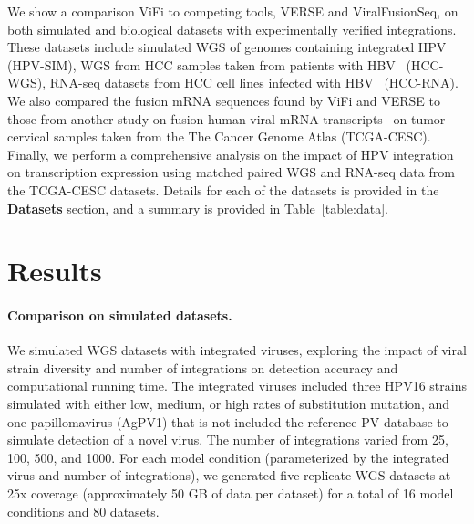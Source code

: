 \documentclass[10pt]{article}
\begin{document}
We show a comparison ViFi to competing tools, VERSE and ViralFusionSeq, on both simulated and biological datasets with experimentally verified integrations.  These datasets include simulated WGS of genomes containing integrated HPV (HPV-SIM), WGS from HCC samples taken from patients with HBV~\cite{Sung2012} (HCC-WGS), RNA-seq datasets from HCC cell lines infected with HBV~\cite{Lau2014} (HCC-RNA).  We also compared the fusion mRNA sequences found by ViFi and VERSE to those from another study on fusion human-viral mRNA transcripts~\cite{Tang2013} on tumor cervical samples taken from the The Cancer Genome Atlas (TCGA-CESC).  Finally, we perform a comprehensive analysis on the impact of HPV integration on transcription expression using matched paired WGS and RNA-seq data from the TCGA-CESC datasets.  Details for each of the datasets is provided in the \textbf{Datasets} section, and a summary is provided in Table~\ref{table:data}. 


\section*{Results}

\paragraph{\textbf{Comparison on simulated datasets.}}  We simulated WGS datasets with integrated viruses, exploring the impact of viral strain diversity and number of integrations on detection accuracy and computational running time.  The integrated viruses included three HPV16 strains simulated with either low, medium, or high rates of substitution mutation, and one papillomavirus (AgPV1) that is not included the reference PV database to simulate detection of a novel virus.  The number of integrations varied from 25, 100, 500, and 1000.  For each model condition (parameterized by the integrated virus and number of integrations), we generated five replicate WGS datasets at 25x coverage (approximately 50 GB of data per dataset) for a total of 16 model conditions and 80 datasets.  
\end{document}
